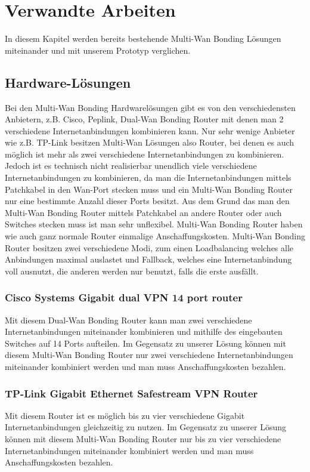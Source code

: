 \chapter{Verwandte Arbeiten}
\label{chap:VerwandteArbeiten}
In diesem Kapitel werden bereits bestehende Multi-Wan Bonding Lösungen miteinander und mit unserem Prototyp verglichen.


\section{Hardware-Lösungen}
Bei den Multi-Wan Bonding Hardwarelösungen gibt es von den verschiedensten Anbietern, z.B. Cisco, Peplink, Dual-Wan Bonding Router mit denen man 2 verschiedene Internetanbindungen kombinieren kann. Nur sehr wenige Anbieter wie z.B. TP-Link besitzen Multi-Wan Lösungen also Router, bei denen es auch möglich ist mehr als zwei verschiedene Internetanbindungen zu kombinieren. Jedoch ist es technisch nicht realisierbar unendlich viele verschiedene Internetanbindungen zu kombinieren, da man die Internetanbindungen mittels Patchkabel in den Wan-Port stecken muss und ein Multi-Wan Bonding Router nur eine bestimmte Anzahl dieser Ports besitzt. Aus dem Grund das man den Multi-Wan Bonding Router mittels Patchkabel an andere Router oder auch Switches stecken muss ist man sehr unflexibel. Multi-Wan Bonding Router haben wie auch ganz normale Router einmalige Anschaffungskosten.
\newline
\newline
Multi-Wan Bonding Router besitzen zwei verschiedene Modi, zum einen Loadbalancing welches alle Anbindungen maximal auslastet und Fallback, welches eine Internetanbindung voll ausnutzt, die anderen werden nur benutzt, falls die erste ausfällt.


\subsection{Cisco Systems Gigabit dual VPN 14 port router}
Mit diesem Dual-Wan Bonding Router kann man zwei verschiedene Internetanbindungen miteinander kombinieren und mithilfe des eingebauten Switches auf 14 Ports aufteilen. 
\newline
\newline
Im Gegensatz zu unserer Lösung können mit diesem Multi-Wan Bonding Router nur zwei verschiedene Internetanbindungen miteinander kombiniert werden und man muss Anschaffungskosten bezahlen. 


\subsection{TP-Link Gigabit Ethernet Safestream VPN Router}
Mit diesem Router ist es möglich bis zu vier verschiedene Gigabit Internetanbindungen gleichzeitig zu nutzen.
\newpage
\noindent
Im Gegensatz zu unserer Lösung können mit diesem Multi-Wan Bonding Router nur bis zu vier verschiedene Internetanbindungen miteinander kombiniert werden und man muss Anschaffungskosten bezahlen.



